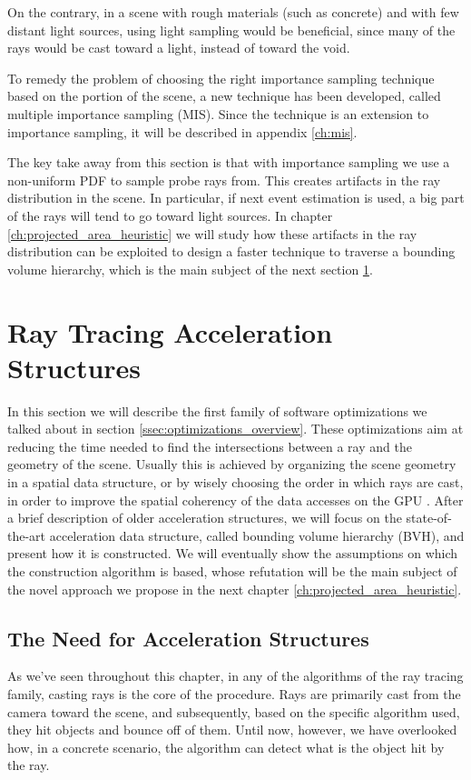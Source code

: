\documentclass{PoliMi_MasterThesis}
\begin{document}
On the contrary, in a scene with rough materials (such as concrete) and with few distant light sources, using light sampling would be beneficial, since many of the rays would be cast toward a light, instead of toward the void.

To remedy the problem of choosing the right importance sampling technique based on the portion of the scene, a new technique has been developed, called multiple importance sampling (MIS). Since the technique is an extension to importance sampling, it will be described in appendix \ref{ch:mis}.

The key take away from this section is that with importance sampling we use a non-uniform PDF to sample probe rays from. This creates artifacts in the ray distribution in the scene. In particular, if next event estimation is used, a big part of the rays will tend to go toward light sources. In chapter \ref{ch:projected_area_heuristic} we will study how these artifacts in the ray distribution can be exploited to design a faster technique to traverse a bounding volume hierarchy, which is the main subject of the next section \ref{sec:ray_tracing_acceleration_structures}.

\section{Ray Tracing Acceleration Structures} \label{sec:ray_tracing_acceleration_structures}
In this section we will describe the first family of software optimizations we talked about in section \ref{ssec:optimizations_overview}. These optimizations aim at reducing the time needed to find the intersections between a ray and the geometry of the scene. Usually this is achieved by organizing the scene geometry in a spatial data structure, or by wisely choosing the order in which rays are cast, in order to improve the spatial coherency of the data accesses on the GPU \cite{ray_coherency}. After a brief description of older acceleration structures, we will focus on the state-of-the-art acceleration data structure, called bounding volume hierarchy (BVH), and present how it is constructed. We will eventually show the assumptions on which the construction algorithm is based, whose refutation will be the main subject of the novel approach we propose in the next chapter \ref{ch:projected_area_heuristic}.

\subsection{The Need for Acceleration Structures} \label{ssec:need_for_acceleration_structures}
As we've seen throughout this chapter, in any of the algorithms of the ray tracing family, casting rays is the core of the procedure. Rays are primarily cast from the camera toward the scene, and subsequently, based on the specific algorithm used, they hit objects and bounce off of them. Until now, however, we have overlooked how, in a concrete scenario, the algorithm can detect what is the object hit by the ray. 
\end{document}
